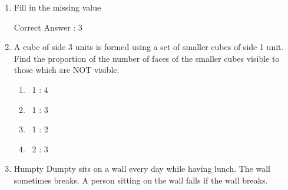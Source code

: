 \documentclass[journal,12pt,onecolumn]{exam}
\theoremstyle{remark}
\newcommand{\cross}{\textcolor{wrongred}{\ding{55}}}
\newcommand{\tick}{\textcolor{correctgreen}{\ding{51}}}
\begin{document}
\begin{enumerate}
\begin{multicols}{4}
 \begin{enumerate}
    \item \textcolor{wrongred}{\cross\ Human progress and security are positively associated with environmental security.}
    \item \textcolor{correctgreen}{\tick\ Human progress is contradictory to environmental security.}
    \item \textcolor{wrongred}{\cross\ Human security is contradictory to environmental security.}
    \item \textcolor{wrongred}{\cross\ Human progress depends upon environmental security.}
\end{enumerate}
\end{multicols}

 

\item

Fill in the missing value



 

Correct Answer : \textcolor{correctgreen}{3}

 

\item

A cube of side 3 units is formed using a set of smaller cubes of side 1 unit. Find the proportion of the number of faces of the smaller cubes visible to those which are NOT visible.

 

\hfill{}

 

\begin{multicols}{4}
 \begin{enumerate}
    \item \textcolor{wrongred}{\cross\ 1 : 4}
    \item \textcolor{wrongred}{\cross\ 1 : 3}
    \item \textcolor{correctgreen}{\tick\ 1 : 2}
    \item \textcolor{wrongred}{\cross\ 2 : 3}
\end{enumerate}
\end{multicols}

 

\item

Humpty Dumpty sits on a wall every day while having lunch. The wall sometimes breaks. A person sitting on the wall falls if the wall breaks.


\end{enumerate}
\end{document}
